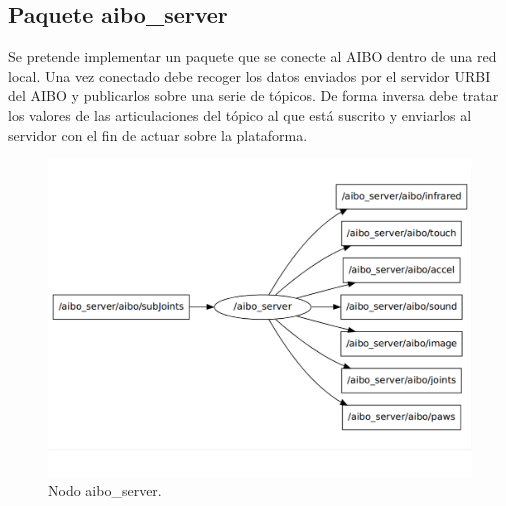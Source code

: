 \documentclass[12pt,a4paper,final,twoside]{book}
\begin{document}
\subsection{Paquete aibo{\_}server }
Se pretende implementar un paquete que se conecte al AIBO dentro de una red local. Una vez conectado debe recoger los datos enviados por el servidor URBI del AIBO y publicarlos sobre una serie de tópicos. De forma inversa debe tratar los valores de las articulaciones del tópico al que está suscrito y enviarlos al servidor con el fin de actuar sobre la plataforma.

\begin{figure}[H]
	\centering
    \includegraphics[scale=0.6]{images/aiboserverNodo.pdf}
	 \caption{Nodo aibo{\_}server.}
  \label{fig:aiboserv}
\end{figure}
\end{document}
